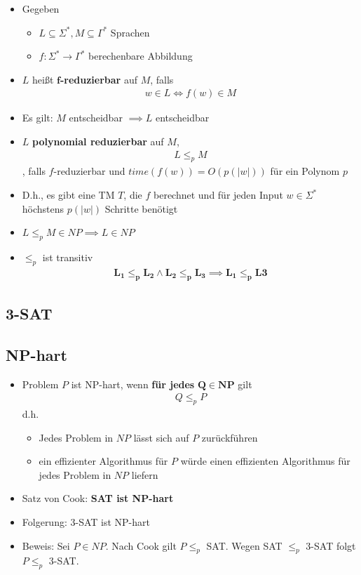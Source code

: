 \documentclass{scrartcl}
\begin{document}
\begin{itemize}
	\item Gegeben
	\begin{itemize}
		\item $L \subseteq \Sigma^*, M \subseteq \Gamma^*$ Sprachen
		\item $f: \Sigma^* \rightarrow \Gamma^*$ berechenbare Abbildung
	\end{itemize}
	\item $L$ heißt $\mathbf{f}$\textbf{-reduzierbar} auf $M$, falls
	\begin{align*}
		w \in L \iff f(w) \in M
	\end{align*}
	\item Es gilt: $M$ entscheidbar $\implies L$ entscheidbar
	\item $L$ \textbf{polynomial reduzierbar} auf $M$,
	\begin{align*}
		L \leq_p M
	\end{align*}
	, falls $f$-reduzierbar und $time(f(w)) = O(p(|w|))$ für ein Polynom $p$
	\item D.h., es gibt eine TM $T$, die $f$ berechnet und für jeden Input $w \in \Sigma^*$ höchstens $p(|w|)$ Schritte benötigt
	\item $L \leq_p M \in NP \implies L \in NP$
	\item $\leq_p$ ist transitiv
	\begin{align*}
		\mathbf{L_1 \leq_p L_2 \wedge L_2 \leq_p L_3 \implies L_1 \leq_p L3}
	\end{align*}
\end{itemize}

\subsection{3-SAT}

\subsection{NP-hart}

\begin{itemize}
	\item Problem $P$ ist NP-hart, wenn \textbf{für jedes} $\mathbf{Q \in NP}$ gilt
	\begin{align*}
		Q \leq_p P
	\end{align*}
	d.h.
	\begin{itemize}
		\item Jedes Problem in $NP$ lässt sich auf $P$ zurückführen
		\item ein effizienter Algorithmus für $P$ würde einen effizienten Algorithmus für jedes Problem in $NP$ liefern
	\end{itemize}
	\item Satz von Cook: \textbf{SAT ist NP-hart}
	\item Folgerung: 3-SAT ist NP-hart
	\item Beweis: Sei $P \in NP$. Nach Cook gilt $P \leq_p$ SAT. Wegen SAT $\leq_p$ 3-SAT folgt $P \leq_p$ 3-SAT.
\end{itemize}
\end{document}
